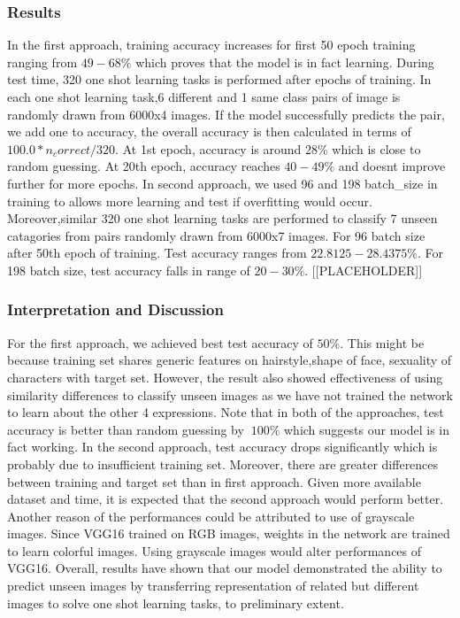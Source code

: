\documentclass{article}
\begin{document}
\subsubsection{\textbf{Results}}
In the first approach, training accuracy increases for first 50 epoch training ranging from $49-68\%$ which proves that the model
is in fact learning. During test time, 320 one shot learning tasks is performed after epochs of training. In each
one shot learning task,6 different and 1 same class pairs of image is randomly drawn from 6000x4 images. If the model successfully predicts the pair, we add one to accuracy, the overall accuracy is then calculated in terms of $100.0*n_correct / 320$. At 1st epoch,
accuracy is around $28\%$ which is close to random guessing. At 20th epoch, accuracy reaches $40-49\%$ and doesnt improve further for more epochs. In second approach, we used 96 and 198 batch_size in training to allows more learning and test if overfitting would occur.
Moreover,similar 320 one shot learning tasks are performed to classify 7 unseen catagories from pairs randomly drawn from 6000x7 images.
For 96 batch size after 50th epoch of training. Test accuracy ranges from $22.8125-28.4375\%$. For 198 batch size, test accuracy falls in range of $20-30\%$.
[[PLACEHOLDER]]

\subsubsection{\textbf{Interpretation and Discussion}}
For the first approach, we achieved best test accuracy of $50\%$. This might be because training set shares generic
features on hairstyle,shape of face, sexuality of characters with target set. However, the result also showed effectiveness of 
using similarity differences to classify unseen images as we have not trained the network to learn about the other 4 expressions.
Note that in both of the approaches, test accuracy is better than random guessing by $~100\%$  which suggests our model is in fact
working. In the second approach, test accuracy drops significantly which is probably due to insufficient training set. Moreover,
there are greater differences between training and target set than in first approach. Given more available dataset and time, it is expected
that the second approach would perform better. Another reason of the performances could be attributed to use of grayscale images. Since 
VGG16 trained on RGB images, weights in the network are trained to learn colorful images. Using grayscale images would alter 
performances of VGG16. Overall, results have shown that our model demonstrated the ability to predict unseen images by transferring 
representation of related but different images to solve one shot learning tasks, to preliminary extent. 
\end{document}
